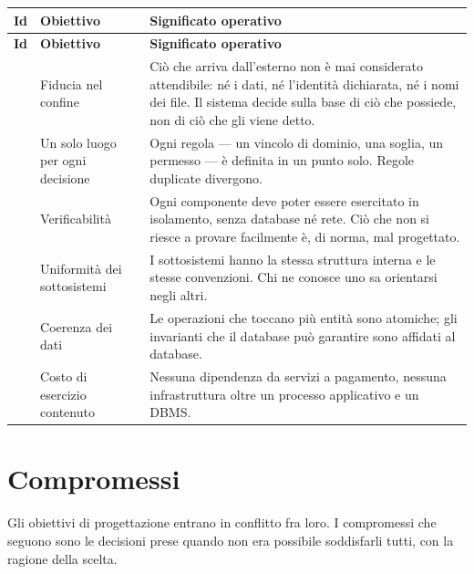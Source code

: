 \begin{longtable}{@{}l L{4.4cm} L{7.4cm}@{}}
\toprule
\textbf{Id} & \textbf{Obiettivo} & \textbf{Significato operativo} \\
\midrule
\endfirsthead
\toprule
\textbf{Id} & \textbf{Obiettivo} & \textbf{Significato operativo} \\
\midrule
\endhead
\bottomrule
\endlastfoot

 & Fiducia nel confine &
Ciò che arriva dall'esterno non è mai considerato attendibile: né i dati,
né l'identità dichiarata, né i nomi dei file. Il sistema decide sulla base
di ciò che possiede, non di ciò che gli viene detto. \\

 & Un solo luogo per ogni decisione &
Ogni regola — un vincolo di dominio, una soglia, un permesso — è definita in
un punto solo. Regole duplicate divergono. \\

 & Verificabilità &
Ogni componente deve poter essere esercitato in isolamento, senza database né
rete. Ciò che non si riesce a provare facilmente è, di norma, mal progettato. \\

 & Uniformità dei sottosistemi &
I sottosistemi hanno la stessa struttura interna e le stesse convenzioni.
Chi ne conosce uno sa orientarsi negli altri. \\

 & Coerenza dei dati &
Le operazioni che toccano più entità sono atomiche; gli invarianti che il
database può garantire sono affidati al database. \\

 & Costo di esercizio contenuto &
Nessuna dipendenza da servizi a pagamento, nessuna infrastruttura oltre un
processo applicativo e un DBMS. \\

\end{longtable}

\section{Compromessi}
\label{sec:sdd-tradeoff}

Gli obiettivi di progettazione entrano in conflitto fra loro. I compromessi
che seguono sono le decisioni prese quando non era possibile soddisfarli
tutti, con la ragione della scelta.

